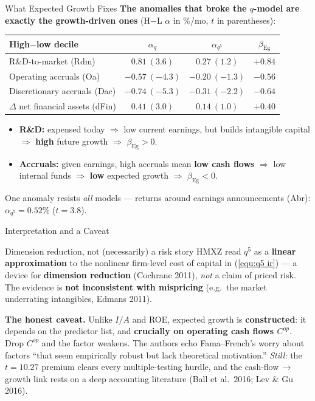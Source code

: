 \documentclass{beamer}
\begin{document}
\begin{frame}{What Expected Growth Fixes}
	\textbf{The anomalies that broke the $q$-model are exactly the growth-driven ones} (H$-$L $\alpha$ in \%/mo, $t$ in parentheses):
	\begin{center}
		\small
		\begin{tabular}{@{}lccc@{}}
			\toprule
			High$-$low decile & $\alpha_q$ & $\alpha_{q^5}$ & $\beta_{\text{Eg}}$ \\
			\midrule
			R\&D-to-market (Rdm)                 & $0.81\ (3.6)$  & $0.27\ (1.2)$  & $+0.84$ \\
			Operating accruals (Oa)              & $-0.57\ (-4.3)$ & $-0.20\ (-1.3)$ & $-0.56$ \\
			Discretionary accruals (Dac)         & $-0.74\ (-5.3)$ & $-0.31\ (-2.2)$ & $-0.64$ \\
			$\Delta$ net financial assets (dFin) & $0.41\ (3.0)$  & $0.14\ (1.0)$  & $+0.40$ \\
			\bottomrule
		\end{tabular}
	\end{center}
	\begin{itemize}
		\item \textbf{R\&D:} expensed today $\Rightarrow$ low current earnings, but builds intangible capital $\Rightarrow$ \textbf{high} future growth $\Rightarrow$ $\beta_{\text{Eg}}>0$.
		\item \textbf{Accruals:} given earnings, high accruals mean \textbf{low cash flows} $\Rightarrow$ low internal funds $\Rightarrow$ \textbf{low} expected growth $\Rightarrow$ $\beta_{\text{Eg}}<0$.
	\end{itemize}
	{\footnotesize One anomaly resists \textit{all} models --- returns around earnings announcements (Abr): $\alpha_{q^5}=0.52\%$ ($t=3.8$).}
\end{frame}

\begin{frame}{Interpretation and a Caveat}
	\begin{block}{Dimension reduction, not (necessarily) a risk story}
		HMXZ read $q^5$ as a \textbf{linear approximation} to the nonlinear firm-level cost of capital in (\ref{equ:q5 ir}) --- a device for \textbf{dimension reduction} (Cochrane 2011), \textit{not} a claim of priced risk. The evidence is \textbf{not inconsistent with mispricing} (e.g.\ the market underrating intangibles, Edmans 2011).
	\end{block}
	\textbf{The honest caveat.} Unlike $I/A$ and ROE, expected growth is \textbf{constructed}: it depends on the predictor list, and \textbf{crucially on operating cash flows $C^{op}$}. Drop $C^{op}$ and the factor weakens. The authors echo Fama--French's worry about factors ``that seem empirically robust but lack theoretical motivation.''
	\vspace{2pt}
	\textit{Still:} the $t=10.27$ premium clears every multiple-testing hurdle, and the cash-flow$\,\to\,$growth link rests on a deep accounting literature (Ball et al.\ 2016; Lev \& Gu 2016).
\end{frame}
\end{document}

